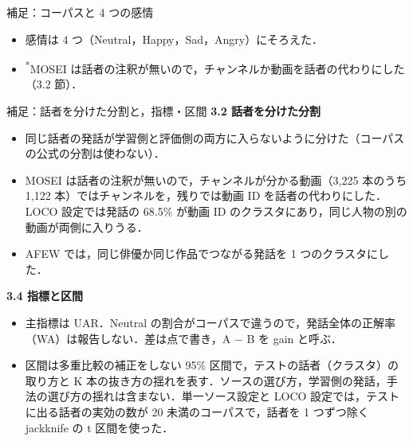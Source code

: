 \begin{frame}{補足：コーパスと 4 つの感情}
\footnotesize
{}
\vspace{0.6em}
\begin{itemize}\setlength\itemsep{2pt}
\item 感情は 4 つ（Neutral，Happy，Sad，Angry）にそろえた．
\item \textsuperscript{*}MOSEI は話者の注釈が無いので，チャンネルか動画を話者の代わりにした（3.2 節）．
\end{itemize}
\end{frame}

\begin{frame}{補足：話者を分けた分割と，指標・区間}
\scriptsize
\textbf{3.2 話者を分けた分割}
\begin{itemize}\setlength\itemsep{2pt}
\item 同じ話者の発話が学習側と評価側の両方に入らないように分けた（コーパスの公式の分割は使わない）．
\item MOSEI は話者の注釈が無いので，チャンネルが分かる動画（3,225 本のうち 1,122 本）ではチャンネルを，残りでは動画 ID を話者の代わりにした．LOCO 設定では発話の 68.5\% が動画 ID のクラスタにあり，同じ人物の別の動画が両側に入りうる．
\item AFEW では，同じ俳優か同じ作品でつながる発話を 1 つのクラスタにした．
\end{itemize}
\vspace{0.4em}
\textbf{3.4 指標と区間}
\begin{itemize}\setlength\itemsep{2pt}
\item 主指標は UAR．Neutral の割合がコーパスで違うので，発話全体の正解率（WA）は報告しない．差は点で書き，A − B を gain と呼ぶ．
\item 区間は多重比較の補正をしない 95\% 区間で，テストの話者（クラスタ）の取り方と K 本の抜き方の揺れを表す．ソースの選び方，学習側の発話，手法の選び方の揺れは含まない．単一ソース設定と LOCO 設定では，テストに出る話者の実効の数が 20 未満のコーパスで，話者を 1 つずつ除く jackknife の t 区間を使った．
\end{itemize}
\end{frame}

